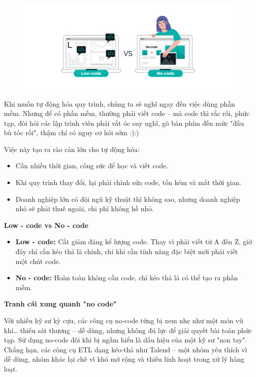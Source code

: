 \begin{figure}[htbp]
    \centering
    \includegraphics[width=1\linewidth]{Chap1-7/cover-Low-Code.pdf}
\end{figure}

Khi muốn tự động hóa quy trình, chúng ta sẽ nghĩ ngay đến việc dùng phần mềm. Nhưng để có phần mềm, thường phải viết code – mà code thì rắc rối, phức tạp, đòi hỏi các lập trình viên phải vắt óc suy nghĩ, gõ bàn phím đến mức "đầu bù tóc rối", thậm chí có nguy cơ hói sớm :):)

Việc này tạo ra rào cản lớn cho tự động hóa:
\begin{itemize}
    \item Cần nhiều thời gian, công sức để học và viết code.

    \item Khi quy trình thay đổi, lại phải chỉnh sửa code, tốn kém và mất thời gian.

    \item Doanh nghiệp lớn có đội ngũ kỹ thuật thì không sao, nhưng doanh nghiệp nhỏ sẽ phải thuê ngoài, chi phí không hề nhỏ.
\end{itemize}

\textbf{Low - code vs No - code}
\begin{itemize}
    \item \textbf{Low - code:} Cắt giảm đáng kể lượng code. Thay vì phải viết từ A đến Z, giờ đây chỉ cần kéo thả là chính, chỉ khi cần tính năng đặc biệt mới phải viết một chút code.

    \item \textbf{No - code:} Hoàn toàn không cần code, chỉ kéo thả là có thể tạo ra phần mềm.
\end{itemize}

\textbf{Tranh cãi xung quanh "no code"}

Với nhiều kỹ sư kỳ cựu, các công cụ no-code từng bị xem nhẹ như một món vũ khí… thiếu sát thương – dễ dùng, nhưng không đủ lực để giải quyết bài toán phức tạp. Sử dụng no-code đôi khi bị ngầm hiểu là dấu hiệu của một kỹ sư "non tay". Chẳng hạn, các công cụ ETL dạng kéo-thả như Talend – một nhóm yêu thích vì dễ dùng, nhóm khác lại chê vì khó mở rộng và thiếu linh hoạt trong xử lý hàng loạt.

